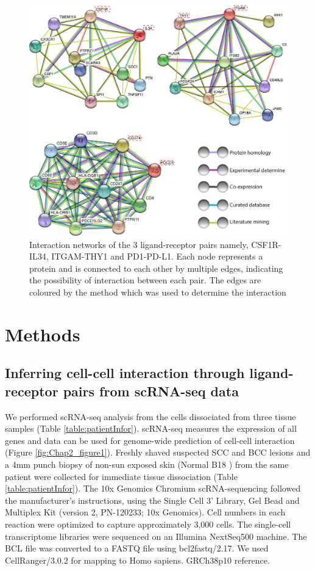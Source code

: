 \begin{figure}[htp]
\renewcommand{\figurename}{Figure}
    \centering
    \includegraphics[width=0.66\columnwidth]{Chapter2/Figures/Supplemental_Fig_S1.png}
    \caption[Interaction networks of the 3 ligand-receptor pairs namely, CSF1R-IL34, ITGAM-THY1 and PD1-PD-L1.]{Interaction networks of the 3 ligand-receptor pairs namely, CSF1R-IL34, ITGAM-THY1 and PD1-PD-L1. Each node represents a protein and is connected to each other by multiple edges, indicating the possibility of interaction between each pair. The edges are coloured by the method which was used to determine the interaction}
    \label{fig:Chap2_Supfigure1}
\end{figure}

\section{Methods}
\label{Sec:Methods}
\subsection{Inferring cell-cell interaction through ligand-receptor pairs from scRNA-seq data}
We performed scRNA-seq analysis from the cells dissociated from three tissue samples (Table \ref{table:patientInfor}). scRNA-seq measures the expression of all genes and data can be used for genome-wide prediction of cell-cell interaction (Figure \ref{fig:Chap2_figure1}). Freshly shaved suspected SCC and BCC lesions and a 4mm punch biopsy of non-sun exposed skin (Normal B18 ) from the same patient were collected for immediate tissue dissociation (Table \ref{table:patientInfor}). The 10x Genomics Chromium scRNA-sequencing followed the manufacturer’s instructions, using the Single Cell 3’ Library, Gel Bead and Multiplex Kit (version 2, PN-120233; 10x Genomics). Cell numbers in each reaction were optimized to capture approximately 3,000 cells. The single-cell transcriptome libraries were sequenced on an Illumina NextSeq500 machine. The BCL file was converted to a FASTQ file using bcl2fastq/2.17. We used CellRanger/3.0.2 for mapping to Homo sapiens. GRCh38p10 reference. 

